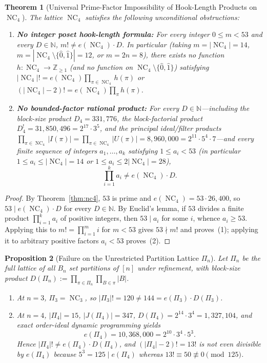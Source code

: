 \documentclass[11pt]{article}
\newtheorem{theorem}{Theorem}[section]
\newtheorem{proposition}[theorem]{Proposition}
\theoremstyle{definition}
\newcommand{\NC}{\operatorname{NC}}
\begin{document}
\begin{theorem}[Universal Prime-Factor Impossibility of Hook-Length Products on $\NC_4$]
\label{thm:universal}
The lattice $\NC_4$ satisfies the following unconditional obstructions:
\begin{enumerate}
  \item \textbf{No integer poset hook-length formula:} For every integer $0 \le m < 53$
  and every $D \in \mathbb{N}$, $m! \ne e(\NC_4) \cdot D$. In particular (taking $m =
  |\NC_4| = 14$, $m = |\NC_4 \setminus \{\hat{0}, \hat{1}\}| = 12$, or $m = 2n = 8$),
  there exists \emph{no} function $h : \NC_4 \to \mathbb{Z}_{\ge 1}$ (and no function on
  $\NC_4 \setminus \{\hat{0}, \hat{1}\}$) satisfying $|\NC_4|! = e(\NC_4) \prod_{\pi \in
  \NC_4} h(\pi)$ or $(|\NC_4|-2)! = e(\NC_4) \prod_{\pi} h(\pi)$.
  \item \textbf{No bounded-factor rational product:}
  For every $D \in \mathbb{N}$---including the block-size product $D_4 = 331{,}776$,
  the block-factorial product $D_4^{!} = 31{,}850{,}496 = 2^{17} \cdot 3^5$, and the
  principal ideal/filter products $\prod_{\pi \in \NC_4} |I(\pi)| = \prod_{\pi \in \NC_4}
  |U(\pi)| = 8{,}960{,}000 = 2^{11} \cdot 5^4 \cdot 7$---and every finite sequence of
  integers $a_1, \dots, a_k$ satisfying $1 \le a_i < 53$ (in particular $1 \le a_i \le
  |\NC_4| = 14$ or $1 \le a_i \le 2|\NC_4| = 28$),
  \[
    \prod_{i=1}^k a_i \ne e(\NC_4) \cdot D.
  \]
\end{enumerate}
\end{theorem}

\begin{proof}
By Theorem~\ref{thm:nc4}, $53$ is prime and $e(\NC_4) = 53 \cdot 26{,}400$, so
$53 \mid e(\NC_4) \cdot D$ for every $D \in \mathbb{N}$. By Euclid's
lemma, if $53$ divides a finite product $\prod_{i=1}^k a_i$ of positive integers, then
$53 \mid a_i$ for some $i$, whence $a_i \ge 53$. Applying this to $m! = \prod_{i=1}^m i$
for $m < 53$ gives $53 \nmid m!$ and proves~(1); applying it to arbitrary positive
factors $a_i < 53$ proves~(2).
\end{proof}

\begin{proposition}[Failure on the Unrestricted Partition Lattice $\Pi_n$]\label{prop:pi4}
Let $\Pi_n$ be the full lattice of all $B_n$ set partitions of $[n]$ under refinement,
with block-size product $D(\Pi_n) := \prod_{\pi \in \Pi_n} \prod_{B \in \pi} |B|$.
\begin{enumerate}
  \item At $n = 3$, $\Pi_3 = \NC_3$, so $|\Pi_3|! = 120 \ne 144 = e(\Pi_3) \cdot D(\Pi_3)$.
  \item At $n = 4$, $|\Pi_4| = 15$, $|J(\Pi_4)| = 347$, $D(\Pi_4) = 2^{14} \cdot 3^4 =
  1{,}327{,}104$, and exact order-ideal dynamic programming yields
  \[
    e(\Pi_4) = 10{,}368{,}000 = 2^{10} \cdot 3^4 \cdot 5^3.
  \]
  Hence $|\Pi_4|! \ne e(\Pi_4) \cdot D(\Pi_4)$, and $(|\Pi_4|-2)! = 13!$ is not even
  divisible by $e(\Pi_4)$ because $5^3 = 125 \mid e(\Pi_4)$ whereas $13! \equiv 50
  \not\equiv 0 \pmod{125}$.
\end{enumerate}
\end{proposition}
\end{document}
